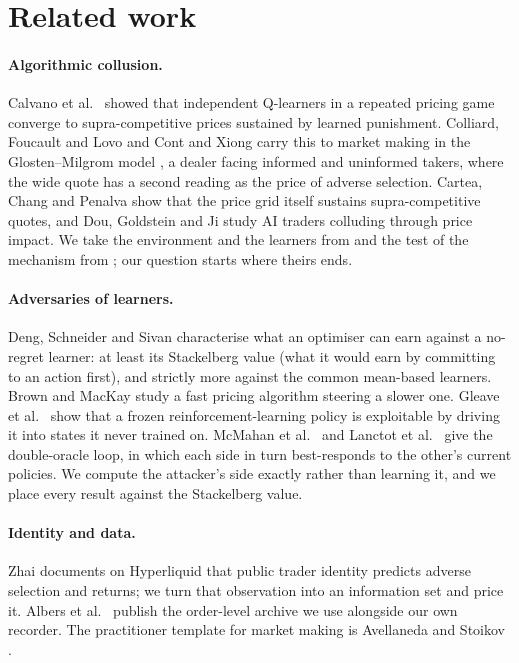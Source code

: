 \documentclass[11pt]{article}
\begin{document}
\section{Related work}

\paragraph{Algorithmic collusion.} Calvano et al.\ \cite{calvano} showed that independent Q-learners in a repeated pricing game converge to supra-competitive prices sustained by learned punishment. Colliard, Foucault and Lovo \cite{cfl} and Cont and Xiong \cite{cont} carry this to market making in the Glosten--Milgrom model \cite{gm}, a dealer facing informed and uninformed takers, where the wide quote has a second reading as the price of adverse selection. Cartea, Chang and Penalva \cite{ccp} show that the price grid itself sustains supra-competitive quotes, and Dou, Goldstein and Ji \cite{dgj} study AI traders colluding through price impact. We take the environment and the learners from \cite{cfl} and the test of the mechanism from \cite{calvano}; our question starts where theirs ends.

\paragraph{Adversaries of learners.} Deng, Schneider and Sivan \cite{dss} characterise what an optimiser can earn against a no-regret learner: at least its Stackelberg value (what it would earn by committing to an action first), and strictly more against the common mean-based learners. Brown and MacKay \cite{brownmackay} study a fast pricing algorithm steering a slower one. Gleave et al.\ \cite{gleave} show that a frozen reinforcement-learning policy is exploitable by driving it into states it never trained on. McMahan et al.\ \cite{mcmahan} and Lanctot et al.\ \cite{psro} give the double-oracle loop, in which each side in turn best-responds to the other's current policies. We compute the attacker's side exactly rather than learning it, and we place every result against the Stackelberg value.

\paragraph{Identity and data.} Zhai \cite{zhai} documents on Hyperliquid that public trader identity predicts adverse selection and returns; we turn that observation into an information set and price it. Albers et al.\ \cite{albers} publish the order-level archive we use alongside our own recorder. The practitioner template for market making is Avellaneda and Stoikov \cite{as}.
\end{document}
